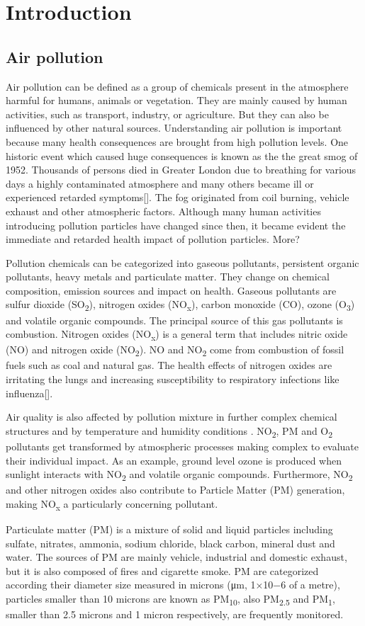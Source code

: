 \chapter{Introduction}
\section{Air pollution}
Air pollution can be defined as a group of chemicals present in the atmosphere harmful for humans, animals or vegetation. They are mainly caused by human activities, such as transport, industry, or agriculture. But they can also be influenced by other natural sources. Understanding air pollution is important because many health consequences are brought from high pollution levels. One historic event which caused huge consequences is known as the the great smog of 1952. Thousands of persons died in Greater London due to  breathing for various days a highly contaminated atmosphere and many others became ill or experienced retarded symptoms[]. The fog originated from coil burning, vehicle exhaust and other atmospheric factors. Although many human activities introducing pollution particles have changed since then, it became evident the immediate and retarded health impact of pollution particles. More?

Pollution chemicals can be categorized into gaseous pollutants, persistent organic pollutants, heavy metals and particulate matter. They change on chemical composition, emission sources and impact on health. Gaseous pollutants are sulfur dioxide (SO\textsubscript{2}), nitrogen oxides (NO\textsubscript{x}), carbon monoxide (CO), ozone (O\textsubscript{3}) and volatile organic compounds. The principal source of this gas pollutants is combustion. Nitrogen oxides (NO\textsubscript{x}) is a general term that includes nitric oxide (NO) and nitrogen oxide (NO\textsubscript{2}). NO and NO\textsubscript{2} come from combustion of fossil fuels such as coal and natural gas. The health effects of nitrogen oxides are irritating the lungs and increasing susceptibility to respiratory infections like influenza[].

Air quality is also affected by pollution mixture in further complex chemical structures and by temperature and humidity conditions . NO\textsubscript{2}, PM and O\textsubscript{2}  pollutants get transformed by atmospheric processes making complex to evaluate their individual impact. As an example, ground level ozone is produced when sunlight interacts with NO\textsubscript{2} and volatile organic compounds. Furthermore, NO\textsubscript{2} and other nitrogen oxides also contribute to Particle Matter (PM) generation, making NO\textsubscript{x} a particularly concerning pollutant.

Particulate matter (PM) is a mixture of solid and liquid particles including sulfate, nitrates, ammonia, sodium chloride, black carbon, mineral dust and water. The sources of PM are mainly vehicle, industrial and domestic exhaust, but it is also composed of fires and cigarette smoke. PM are categorized according their diameter size measured in microns (μm, 1×10−6 of a metre), particles smaller than 10 microns are known as PM\textsubscript{10}, also PM\textsubscript{2.5} and PM\textsubscript{1}, smaller than 2.5 microns and 1 micron respectively, are frequently monitored.